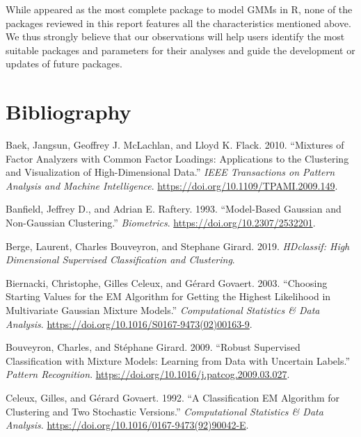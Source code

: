 While  appeared as the most complete package to model GMMs in R, none of the packages reviewed in this report features all the characteristics mentioned above.
We thus strongly believe that our observations will help users identify the most suitable packages and parameters for their analyses and guide the development or updates of future packages.

\hypertarget{bibliography}{%
\section{Bibliography}\label{bibliography}}

\hypertarget{refs}{}
\begin{CSLReferences}{1}{0}
\leavevmode{}%
Baek, Jangsun, Geoffrey J. McLachlan, and Lloyd K. Flack. 2010. {``Mixtures of {Factor} {Analyzers} with {Common} {Factor} {Loadings}: {Applications} to the {Clustering} and {Visualization} of {High}-{Dimensional} {Data}.''} \emph{IEEE Transactions on Pattern Analysis and Machine Intelligence}. \url{https://doi.org/10.1109/TPAMI.2009.149}.

\leavevmode{}%
Banfield, Jeffrey D., and Adrian E. Raftery. 1993. {``Model-{Based Gaussian} and {Non-Gaussian Clustering}.''} \emph{Biometrics}. \url{https://doi.org/10.2307/2532201}.

\leavevmode{}%
Berge, Laurent, Charles Bouveyron, and Stephane Girard. 2019. \emph{HDclassif: High Dimensional Supervised Classification and Clustering}.

\leavevmode{}%
Biernacki, Christophe, Gilles Celeux, and Gérard Govaert. 2003. {``Choosing Starting Values for the {EM} Algorithm for Getting the Highest Likelihood in Multivariate {Gaussian} Mixture Models.''} \emph{Computational Statistics \& Data Analysis}. \url{https://doi.org/10.1016/S0167-9473(02)00163-9}.

\leavevmode{}%
Bouveyron, Charles, and Stéphane Girard. 2009. {``{Robust Supervised Classification} with {Mixture Models}: {Learning} from {Data} with {Uncertain Labels}.''} \emph{Pattern Recognition}. \url{https://doi.org/10.1016/j.patcog.2009.03.027}.

\leavevmode{}%
Celeux, Gilles, and Gérard Govaert. 1992. {``A Classification {EM} Algorithm for Clustering and Two Stochastic Versions.''} \emph{Computational Statistics \& Data Analysis}. \url{https://doi.org/10.1016/0167-9473(92)90042-E}.


\end{CSLReferences}

